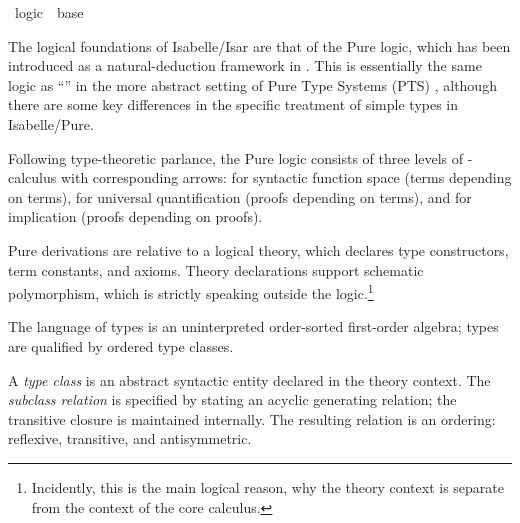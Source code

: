 %
\begin{isabellebody}%
\def\isabellecontext{logic}%
%
\isadelimtheory
\isanewline
\isanewline
\isanewline
%
\endisadelimtheory
%
\isatagtheory
{}\isamarkupfalse%
\ logic\ \ base\ %
\endisatagtheory
{\isafoldtheory}%
%
\isadelimtheory
%
\endisadelimtheory
%
\isamarkuptrue%
%
\begin{isamarkuptext}%
The logical foundations of Isabelle/Isar are that of the Pure logic,
  which has been introduced as a natural-deduction framework in
  \cite{paulson700}.  This is essentially the same logic as ``'' in the more abstract setting of Pure Type Systems (PTS)
  \cite{Barendregt-Geuvers:2001}, although there are some key
  differences in the specific treatment of simple types in
  Isabelle/Pure.

  Following type-theoretic parlance, the Pure logic consists of three
  levels of \isa{{\isasymlambda}}-calculus with corresponding arrows: \isa{{\isasymRightarrow}} for syntactic function space (terms depending on terms), \isa{{\isasymAnd}} for universal quantification (proofs depending on terms), and
  \isa{{\isasymLongrightarrow}} for implication (proofs depending on proofs).

  Pure derivations are relative to a logical theory, which declares
  type constructors, term constants, and axioms.  Theory declarations
  support schematic polymorphism, which is strictly speaking outside
  the logic.\footnote{Incidently, this is the main logical reason, why
  the theory context \isa{{\isasymTheta}} is separate from the context \isa{{\isasymGamma}} of the core calculus.}%
\end{isamarkuptext}%
\isamarkuptrue%
%
\isamarkuptrue%
%
\begin{isamarkuptext}%
The language of types is an uninterpreted order-sorted first-order
  algebra; types are qualified by ordered type classes.

  \medskip A \emph{type class} is an abstract syntactic entity
  declared in the theory context.  The \emph{subclass relation}  is specified by stating an acyclic
  generating relation; the transitive closure is maintained
  internally.  The resulting relation is an ordering: reflexive,
  transitive, and antisymmetric.


\end{isamarkuptext}
\end{isabellebody}
